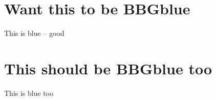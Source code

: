 \documentclass[english,aspectratio=169,handout]{beamer}
\begin{document}
\section{Want this to be BBGblue}
\begin{frame}{This is blue -- good}
\end{frame}

\section{This should be BBGblue too}
\begin{frame}{This is blue too}
\end{frame}
\end{document}
